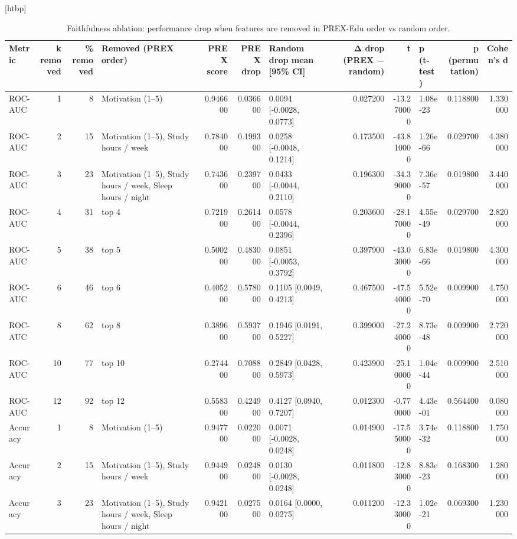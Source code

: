 \begin{table}
\small[htbp]
\caption{Faithfulness ablation: performance drop when features are removed in PREX-Edu order vs random order.}
\label{tab:T12_faithfulness_ablation}
\begin{tabular}{lrrlrrlrrlrr}
\toprule
Metric & k removed & \% removed & Removed (PREX order) & PREX score & PREX drop & Random drop mean [95\% CI] & Δ drop (PREX − random) & t & p (t-test) & p (permutation) & Cohen's d \\
\midrule
ROC-AUC & 1 & 8 & Motivation (1–5) & 0.946600 & 0.036600 & 0.0094 [-0.0028, 0.0773] & 0.027200 & -13.270000 & 1.08e-23 & 0.118800 & 1.330000 \\
ROC-AUC & 2 & 15 & Motivation (1–5), Study hours / week & 0.784000 & 0.199300 & 0.0258 [-0.0048, 0.1214] & 0.173500 & -43.810000 & 1.26e-66 & 0.029700 & 4.380000 \\
ROC-AUC & 3 & 23 & Motivation (1–5), Study hours / week, Sleep hours / night & 0.743600 & 0.239700 & 0.0433 [-0.0044, 0.2110] & 0.196300 & -34.390000 & 7.36e-57 & 0.019800 & 3.440000 \\
ROC-AUC & 4 & 31 & top 4 & 0.721900 & 0.261400 & 0.0578 [-0.0044, 0.2396] & 0.203600 & -28.170000 & 4.55e-49 & 0.029700 & 2.820000 \\
ROC-AUC & 5 & 38 & top 5 & 0.500200 & 0.483000 & 0.0851 [-0.0053, 0.3792] & 0.397900 & -43.030000 & 6.83e-66 & 0.019800 & 4.300000 \\
ROC-AUC & 6 & 46 & top 6 & 0.405200 & 0.578000 & 0.1105 [0.0049, 0.4213] & 0.467500 & -47.540000 & 5.52e-70 & 0.009900 & 4.750000 \\
ROC-AUC & 8 & 62 & top 8 & 0.389600 & 0.593700 & 0.1946 [0.0191, 0.5227] & 0.399000 & -27.240000 & 8.73e-48 & 0.009900 & 2.720000 \\
ROC-AUC & 10 & 77 & top 10 & 0.274400 & 0.708800 & 0.2849 [0.0428, 0.5973] & 0.423900 & -25.100000 & 1.04e-44 & 0.009900 & 2.510000 \\
ROC-AUC & 12 & 92 & top 12 & 0.558300 & 0.424900 & 0.4127 [0.0940, 0.7207] & 0.012300 & -0.770000 & 4.43e-01 & 0.564400 & 0.080000 \\
Accuracy & 1 & 8 & Motivation (1–5) & 0.947700 & 0.022000 & 0.0071 [-0.0028, 0.0248] & 0.014900 & -17.550000 & 3.74e-32 & 0.118800 & 1.750000 \\
Accuracy & 2 & 15 & Motivation (1–5), Study hours / week & 0.944900 & 0.024800 & 0.0130 [-0.0028, 0.0248] & 0.011800 & -12.830000 & 8.83e-23 & 0.168300 & 1.280000 \\
Accuracy & 3 & 23 & Motivation (1–5), Study hours / week, Sleep hours / night & 0.942100 & 0.027500 & 0.0164 [0.0000, 0.0275] & 0.011200 & -12.330000 & 1.02e-21 & 0.069300 & 1.230000 \\

\end{tabular}
\end{table}
